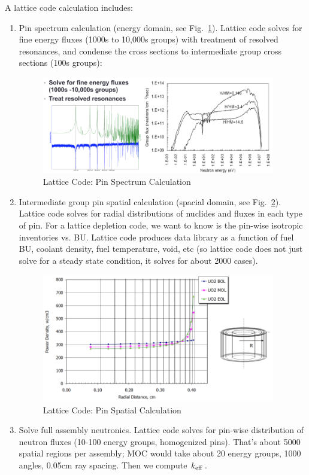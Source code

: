 \documentclass{school-22.211-notes}
\begin{document}
\clearpage
{}
A lattice code calculation includes:
\begin{enumerate}
\item Pin spectrum calculation (energy domain, see Fig.~\ref{lattice-energy}). Lattice code solves for fine energy fluxes (1000s to 10,000s groups) with treatment of resolved resonances, and condense the cross sections to intermediate group cross sections (100s groups): 
\begin{figure}[ht]
  \centering
  \includegraphics[width=4in]{images/design/lattice-energy.png}
  \caption{Lattice Code: Pin Spectrum Calculation} \label{lattice-energy}
\end{figure}

\item Intermediate group pin spatial calculation (spacial domain, see Fig.~\ref{lattice-space}). Lattice code solves for radial distributions of nuclides and fluxes in each type of pin. For a lattice depletion code, we want to know is the pin-wise isotropic inventories vs. BU. Lattice code produces data library as a function of fuel BU, coolant density, fuel temperature, void, etc (so lattice code does not just solve for a steady state condition, it solves for about 2000 cases). 
\begin{figure}[ht]
  \centering
  \includegraphics[width=4in]{images/design/lattice-space.png}
  \caption{Lattice Code: Pin Spatial Calculation} \label{lattice-space}
\end{figure}

\item Solve full assembly neutronics. Lattice code solves for pin-wise distribution of neutron fluxes (10-100 energy groups, homogenized pins). That's about 5000 spatial regions per assembly; MOC would take about 20 energy groups, 1000 angles, 0.05cm ray spacing. Then we compute $\left. k_{\mathrm{eff}} \right.$. 
\end{enumerate}
\end{document}
